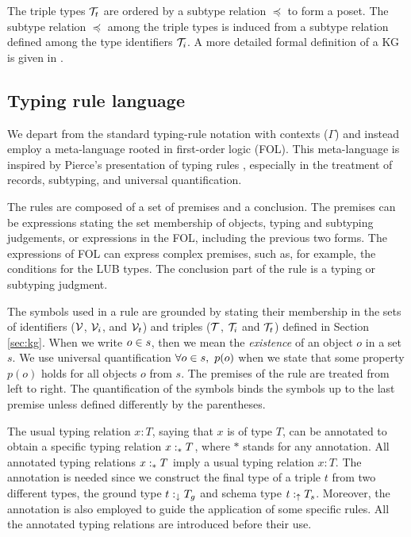 \documentclass[runningheads]{llncs}
\newcommand{\darr}{\downarrow}
\newcommand{\uarr}{\uparrow}
\newcommand{\V}{{\cal V}}
\newcommand{\T}{{\cal T}}
\begin{document}
The triple types $\T_t$ are ordered by a subtype relation $\preceq$ to
form a poset. The subtype relation $\preceq$ among the triple types is
induced from a subtype relation defined among the type identifiers
$\T_i$. A more detailed formal definition of a KG is given in
\cite{Savnik2025}.




\subsection{Typing rule language}

We depart from the standard typing-rule notation with contexts
($\Gamma$) \cite{Pierce2002,Hindley1997} and instead employ a
meta-language rooted in first-order logic (FOL). This meta-language is
inspired by Pierce’s presentation of typing rules \cite{Pierce2002},
especially in the treatment of records, subtyping, and universal
quantification.

The rules are composed of a set of premises and a conclusion. The
premises can be expressions stating the set membership of objects,
typing and subtyping judgements, or expressions in the FOL, including
the previous two forms. The expressions of FOL can express complex
premises, such as, for example, the conditions for the LUB types. The
conclusion part of the rule is a typing or subtyping judgment.

The symbols used in a rule are grounded by stating their membership in
the sets of identifiers ($\V$, $\V_i$, and $\V_t$) and triples ($\T$,
$\T_i$ and $\T_t$) defined in Section \ref{sec:kg}. When we write
$o\in\/s$, then we mean the \emph{existence} of an object $o$ in a set
$s$. We use universal quantification $\forall\/o\in\/s,\ p(o)$ when we
state that some property $p(o)$ holds for all objects $o$ from
$s$. The premises of the rule are treated from left to right. The
quantification of the symbols binds the symbols up to the last premise
unless defined differently by the parentheses.

The usual typing relation $x:T$, saying that $x$ is of type $T$, can
be annotated to obtain a specific typing relation $x:_*\/T$, where $*$
stands for any annotation. All annotated typing relations $x:_*\/T$
imply a usual typing relation $x:T$. The annotation is needed since we
construct the final type of a triple $t$ from two different types, the
ground type $t:_\darr\/T_g$ and schema type $t:_\uarr\/T_s$. Moreover,
the annotation is also employed to guide the application of
some specific rules. All the annotated typing relations are introduced
before their use.
\end{document}
